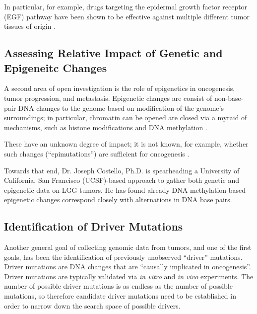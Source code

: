         In particular, for  example, drugs targeting the epidermal growth factor receptor
        (EGF) pathway have been shown to be effective against multiple
        different tumor tissues of origin
        \cite{barretina_cancer_2012}.


        \subsection{Assessing Relative Impact of Genetic and
          Epigeneitc Changes}

        A second area of open investigation is the role of epigenetics
        in oncogenesis, tumor progression, and
        metastasis. Epigenetic changes are consist of non-base-pair
        DNA changes to the genome based on modification of the
        genome's surroundings; in particular, chromatin can be opened
        are closed via a myraid of mechanisms, such as histone
       modifications and DNA methylation .

        These have an unknown degree of impact;
        it is not known, for example, whether such changes
        (``epimutations'') are sufficient for oncogenesis . 

        Towards that end, Dr. Joseph Costello, Ph.D. is spearheading a
        University of California, San Francisco (UCSF)-based approach to
        gather both genetic and epigenetic data on LGG tumors. He has
        found already DNA methylation-based epigenetic changes
        correspond closely with alternations in DNA base
        pairs\cite{johnson_mutational_2014}. 

        \subsection{Identification of Driver Mutations}

        Another general goal of collecting genomic data from tumors,
        and one of the first goals, has been the identification of
        previously unobserved  ``driver'' mutations. Driver mutations are DNA changes that
        are  ``causally implicated
        in oncogenesis''\cite{stratton_cancer_2009}. Driver mutations
        are typically validated via \textit{in vitro} and \textit{in vivo}
        experiments. The number of possible driver mutations is as
        endless as the number of possible mutations, so therefore
        candidate driver mutations need to be established in order to
        narrow down the search space of possible drivers. 

